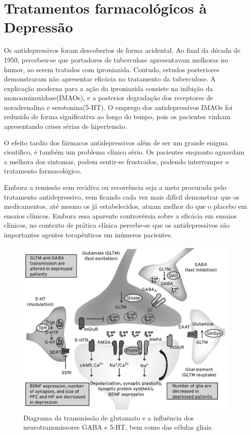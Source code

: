 \section{Tratamentos farmacológicos à Depressão}

Os antidepressivos foram descobertos de forma acidental. Ao final da década de 1950, percebeu-se que portadores de tuberculose apresentavam melhoras no humor, ao serem tratados com iproniazida. Contudo, estudos posteriores demonstraram não apresentar eficácia no tratamento da tuberculose. A explicação moderna para a ação da iproniazida consiste na inibição da monoaminoxidase(IMAOs), e a posterior degradação dos receptores de noradrenalina e serotonina(5-HT). O emprego dos antidepressivos IMAOs foi reduzido de forma significativa ao longo do tempo, pois os pacientes vinham apresentando crises sérias de hipertensão.  \cite{Schatzberg2015}

O efeito tardio dos fármacos antidepressivos além de ser um grande enigma científico, é também um problema clínico sério. Os pacientes enquanto aguardam a melhora dos sintomas, podem sentir-se frustrados, podendo interromper o tratamento farmacológico. \cite{Kandel}

Embora a remissão sem recidiva ou recorrência seja a meta procurada pelo tratamento antidepressivo, vem ficando cada vez mais difícil demonstrar que os medicamentos, até mesmo os já estabelecidos, atuam melhor do que o placebo em ensaios clínicos. Embora essa aparente controvérsia sobre a eficácia em ensaios clínicos, no contexto de prática clínica percebe-se que os antidepressivos são importantes agentes terapêuticos em inúmeros pacientes. \cite{Stahl}

\begin{figure}[H]
\centering
\includegraphics[scale=1.3]{Figuras/glutamate.png}
\caption{Diagrama da transmissão de glutamato e a influência dos neurotransmissores GABA e 5-HT, bem como das células gliais.  \cite{Charney2004}}
\end{figure}


